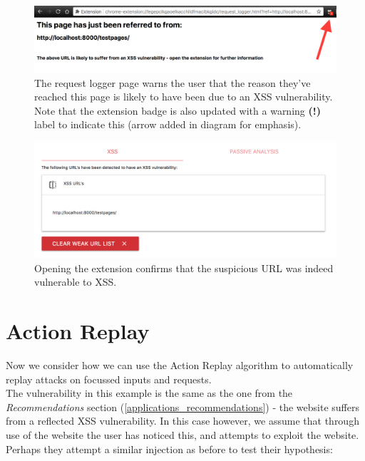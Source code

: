\begin{figure}[h]
	\centering
	\includegraphics[width=	\textwidth]{images/request_logger_warning.png}
	\caption{The request logger page warns the user that the reason they've reached this page is likely to have been due to an XSS vulnerability. Note that the extension badge is also updated with a warning \textbf{(!)} label to indicate this (arrow added in diagram for emphasis).}
	\label{fig:request_logger_warning}
\end{figure}

\begin{figure}[h]
	\centering
	\includegraphics[width=	\textwidth]{images/xss_vulnerable_url.png}
	\caption{Opening the extension confirms that the suspicious URL was indeed vulnerable to XSS.}
	\label{fig:xss_vulnerable_url}
\end{figure}


\section{Action Replay}

Now we consider how we can use the Action Replay algorithm to automatically replay attacks on focussed inputs and requests. \\

The vulnerability in this example is the same as the one from the \textit{Recommendations} section (\ref{applications_recommendations}) - the website suffers from a reflected XSS vulnerability. In this case however, we assume that through use of the website the user has noticed this, and attempts to exploit the website. Perhaps they attempt a similar injection as before to test their hypothesis:

